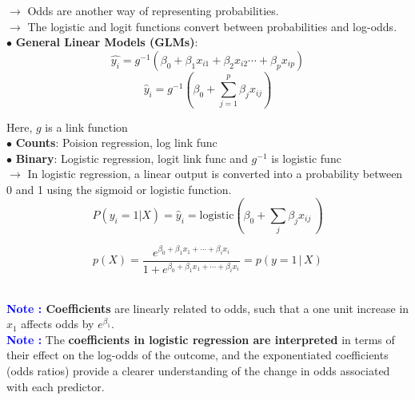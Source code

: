 \documentclass[letterpaper, 10.5pt,landscape]{article}
\begin{document}
\begin{multicols*}{3}
\vspace{3pt}
$\rightarrow$ Odds are another way of representing probabilities.\\
$\rightarrow$ The logistic and logit functions convert between probabilities and log-odds. \\



\vspace{3pt}
$\bullet$ \textbf{General Linear Models (GLMs)}: 
\vspace{-3pt}
\[\hat{y_{i}} = g^{-1}\left(\beta_{0} + \beta_{1} x_{i1} + \beta_{2} x_{i2} \cdots + \beta_{p} x_{ip} \right) \]
\vspace{-5pt}
\[\boxed{\hat{y}_{i} = g^{-1}\left(\beta_{0} + \sum_{j=1}^{p} \beta_{j} x_{ij}  \right)}\]

Here, $g$ is a link function 
\\

$\bullet$ \textbf{Counts}: Poision regression, log link func \\
$\bullet$ \textbf{Binary}: Logistic regression, logit link  func and $g^{-1}$ is logistic func \\


$\rightarrow$ In logistic regression, a linear output is converted into a probability between 0 and 1 using the sigmoid or logistic function. 
\vspace{-4pt}
\[\boxed{P(y_{i}=1|X) = \hat{y}_{i} = \text{logistic} \left(\beta_{0} + \sum_{j} \beta_{j} x_{ij} \ \right)} \]

\vspace{-3pt}
\[\boxed{ p(X) = \frac{e^{\beta_{0} + \beta_{1}x_{1} + \cdots + \beta_{i} x_{i}}}{1 + e^{\beta_{0} + \beta_{1}x_{1} + \cdots + \beta_{i} x_{i}}}  = p(y = 1 \, | \, X)}\] \




\textbf{\textcolor{blue}{Note :} Coefficients} are linearly related to odds, such that a one unit increase in $x_{1}$ affects odds by $e^{\beta_{1}}$. \\

\textbf{\textcolor{blue}{Note :}} The \textbf{coefficients in logistic regression are interpreted} in terms of their effect on the log-odds of the outcome, and the exponentiated coefficients (odds ratios) provide a clearer understanding of the change in odds associated with each predictor.




\end{multicols*}
\end{document}
